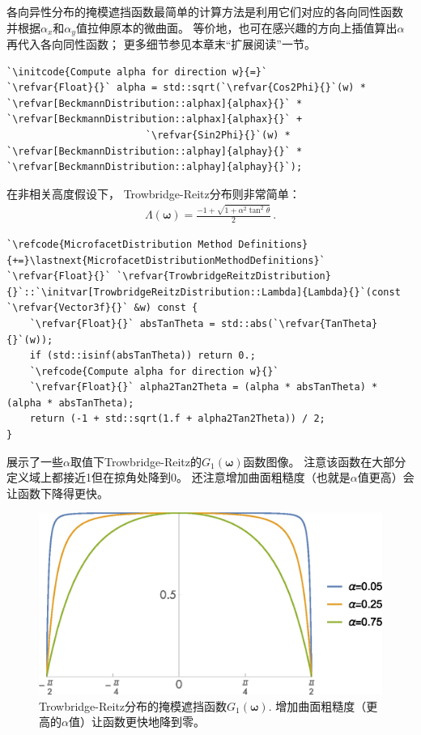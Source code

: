 各向异性分布的掩模遮挡函数最简单的计算方法是利用它们对应的各向同性函数
并根据$\alpha_x$和$\alpha_y$值拉伸原本的微曲面。
等价地，也可在感兴趣的方向上插值算出$\alpha$再代入各向同性函数；
更多细节参见本章末“扩展阅读”一节。
\begin{lstlisting}
`\initcode{Compute alpha for direction w}{=}`
`\refvar{Float}{}` alpha = std::sqrt(`\refvar{Cos2Phi}{}`(w) * `\refvar[BeckmannDistribution::alphax]{alphax}{}` * `\refvar[BeckmannDistribution::alphax]{alphax}{}` +
                        `\refvar{Sin2Phi}{}`(w) * `\refvar[BeckmannDistribution::alphay]{alphay}{}` * `\refvar[BeckmannDistribution::alphay]{alphay}{}`);
\end{lstlisting}

在非相关高度假设下，
Trowbridge-Reitz分布则非常简单：
\begin{align*}
    \Lambda({\bm\omega})=\frac{-1+\sqrt{1+\alpha^2\tan^2\theta}}{2}\, .
\end{align*}
\begin{lstlisting}
`\refcode{MicrofacetDistribution Method Definitions}{+=}\lastnext{MicrofacetDistributionMethodDefinitions}`
`\refvar{Float}{}` `\refvar{TrowbridgeReitzDistribution}{}`::`\initvar[TrowbridgeReitzDistribution::Lambda]{Lambda}{}`(const `\refvar{Vector3f}{}` &w) const {
    `\refvar{Float}{}` absTanTheta = std::abs(`\refvar{TanTheta}{}`(w));
    if (std::isinf(absTanTheta)) return 0.;
    `\refcode{Compute alpha for direction w}{}`
    `\refvar{Float}{}` alpha2Tan2Theta = (alpha * absTanTheta) * (alpha * absTanTheta);
    return (-1 + std::sqrt(1.f + alpha2Tan2Theta)) / 2;
}
\end{lstlisting}

展示了一些$\alpha$取值下Trowbridge-Reitz的$G_1({\bm\omega})$函数图像。
注意该函数在大部分定义域上都接近1但在掠角处降到0。
还注意增加曲面粗糙度（也就是$\alpha$值更高）会让函数下降得更快。
\begin{figure}[htbp]
    \centering
    \includegraphics[width=0.75\linewidth]{Pictures/chap08/tr-g1-vs-alpha.eps}
    \caption{Trowbridge-Reitz分布的掩模遮挡函数$G_1({\bm\omega})$.
    增加曲面粗糙度（更高的$\alpha$值）让函数更快地降到零。}
    \label{fig:8.18}
\end{figure}

